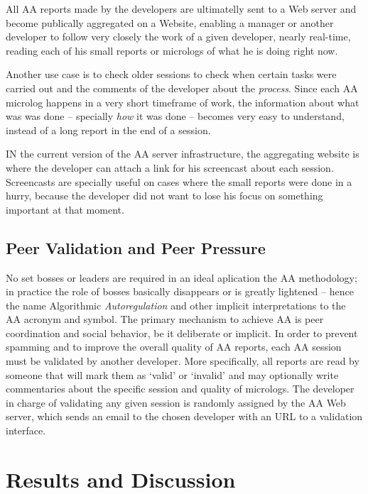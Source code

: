 \documentclass{article}
\begin{document}
All AA reports made by the developers are ultimatelly sent to a Web server and
become publically aggregated on a Website, enabling a manager or another
developer to follow very closely the work of a given developer, nearly real-time,
reading each of his small reports or micrologs of what he is doing right now.

Another use case is to check older sessions to check when certain tasks
were carried out and the comments of the developer about the \emph{process}.
Since each AA microlog happens in a very short timeframe of work, the information
about what was was done -- specially \emph{how} it was done -- becomes very easy to
understand, instead of a long report in the end of a session.

IN the current version of the AA server infrastructure, the aggregating
website is where the developer can attach a link for his
screencast about each session. Screencasts are specially useful on cases where
the small reports were done in a hurry, because the developer did not want to
lose his focus on something important at that moment.

\subsection{Peer Validation and Peer Pressure}

No set bosses or leaders are required in an ideal aplication the AA methodology;
in practice the role of bosses basically disappears or is greatly lightened --
hence the name Algorithmic \emph{Autoregulation} and other implicit
interpretations to the AA acronym and symbol. The primary mechanism to achieve
AA is peer coordination and social behavior, be it deliberate or implicit. In
order to prevent spamming and to improve the overall quality of AA reports, each
AA session must be validated by another developer. More specifically, all
reports are read by someone that will mark them as `valid' or `invalid' and may
optionally write commentaries about the specific session and quality of
micrologs. The developer in charge of validating any given session is randomly
assigned by the AA Web server, which sends an email to the chosen developer with
an URL to a validation interface. 


\section{Results and Discussion}
\label{results}
\end{document}
